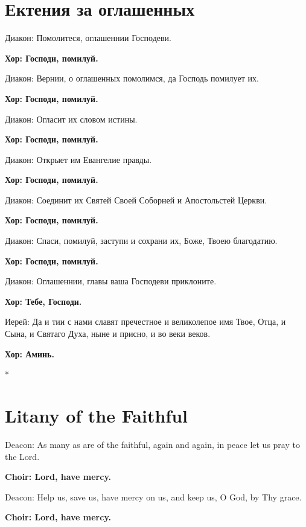 \documentclass[12pt,a4paper,titlepage]{report}
\begin{document}
\begin{paracol}[1]{2}
	\section*{Ектения за оглашенных}
	
	Диакон: Помолитеся, оглашеннии Господеви.
	
	\textbf{Хор: Господи, помилуй.}
	
	Диакон: Вернии, о оглашенных помолимся, да Господь помилует их.
	
	\textbf{Хор: Господи, помилуй.}
	
	Диакон: Огласит их словом истины.
	
	\textbf{Хор: Господи, помилуй.}
	
	Диакон: Открыет им Евангелие правды.
	
	\textbf{Хор: Господи, помилуй.}
	
	Диакон: Соединит их Святей Своей Соборней и Апостольстей Церкви.
	
	\textbf{Хор: Господи, помилуй.}
	
	Диакон: Спаси, помилуй, заступи и сохрани их, Боже, Твоею благодатию.
	
	\textbf{Хор: Господи, помилуй.}
	
	Диакон: Оглашеннии, главы ваша Господеви приклоните.
	
	\textbf{Хор: Тебе, Господи.}
	
	Иерей: Да и тии с нами славят пречестное и великолепое имя Твое, Отца, и Сына, и Святаго Духа, ныне и присно, и во веки веков.
	
	\textbf{Хор: Аминь.}
	
	\switchcolumn[0]*
	
	\section*{Litany of the Faithful}
	
	Deacon: As many as are of the faithful, again and again, in peace let us pray to the Lord.
	
	\textbf{Choir: Lord, have mercy.}
	
	Deacon: Help us, save us, have mercy on us, and keep us, O God, by Thy grace.
	
	\textbf{Choir: Lord, have mercy.}
	

\end{paracol}
\end{document}
